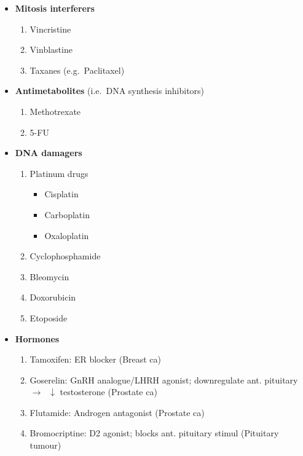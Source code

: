 \documentclass[
  14pt,
]{memoir}
\providecommand{\tightlist}{%
  \setlength{\itemsep}{0pt}\setlength{\parskip}{0pt}}
\begin{document}
\begin{itemize}
\tightlist
\item
  \textbf{Mitosis interferers}

  \begin{enumerate}
  \def\labelenumi{\arabic{enumi}.}
  \tightlist
  \item
    Vincristine
  \item
    Vinblastine
  \item
    Taxanes (e.g.~Paclitaxel)
  \end{enumerate}
\item
  \textbf{Antimetabolites} (i.e.~DNA synthesis inhibitors)

  \begin{enumerate}
  \def\labelenumi{\arabic{enumi}.}
  \tightlist
  \item
    Methotrexate
  \item
    5-FU
  \end{enumerate}
\item
  \textbf{DNA damagers}

  \begin{enumerate}
  \def\labelenumi{\arabic{enumi}.}
  \tightlist
  \item
    Platinum drugs

    \begin{itemize}
    \tightlist
    \item
      Cisplatin
    \item
      Carboplatin
    \item
      Oxaloplatin
    \end{itemize}
  \item
    Cyclophosphamide
  \item
    Bleomycin
  \item
    Doxorubicin
  \item
    Etoposide
  \end{enumerate}
\item
  \textbf{Hormones}

  \begin{enumerate}
  \def\labelenumi{\arabic{enumi}.}
  \tightlist
  \item
    Tamoxifen: ER blocker (Breast ca)
  \item
    Goserelin: GnRH analogue/LHRH agonist; downregulate ant. pituitary
    \(\rightarrow\;\;\downarrow\) testosterone (Prostate ca)
  \item
    Flutamide: Androgen antagonist (Prostate ca)
  \item
    Bromocriptine: D2 agonist; blocks ant. pituitary stimul (Pituitary
    tumour)
  \end{enumerate}
\end{itemize}
\end{document}
